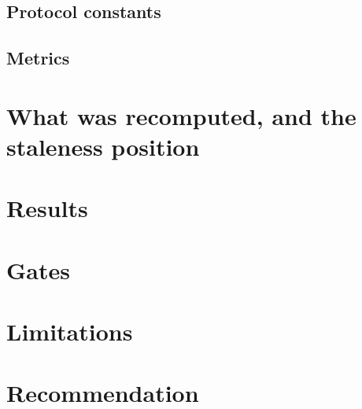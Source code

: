 \documentclass[11pt]{article}
\begin{document}
\subsection{Protocol constants}

\subsection{Metrics}

\section{What was recomputed, and the staleness position}

\section{Results}

\section{Gates}

\section{Limitations}
\label{sec:lim}

\section{Recommendation}
\label{sec:reco}
\end{document}
